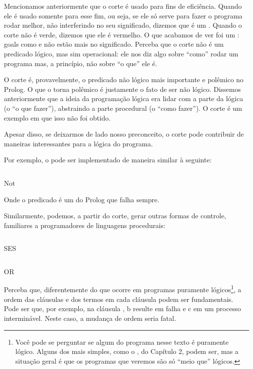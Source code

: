 \documentclass{article}
\begin{document}
Mencionamos anteriormente que o corte é usado para fins de eficiência. Quando ele é usado somente para esse fim, ou seja, se ele só serve para fazer o programa rodar melhor, não interferindo no seu significado, dizemos que é um .
Quando o corte não é verde, dizemos que ele é vermelho. O que acabamos de ver foi um : goals como  e  não estão mais no significado. Perceba que o corte não é um predicado lógico, mas sim operacional: ele nos diz algo sobre ``como'' rodar um programa mas, a princípio, não sobre ``o que'' ele é.

O corte é, provavelmente, o predicado não lógico mais importante e polêmico no Prolog. O que o torna polêmico é justamente o fato de ser não lógico. Dissemos anteriormente que a ideia da programação lógica era lidar com a parte da lógica (o ``o que fazer''), abstraindo a parte procedural (o ``como fazer''). O corte é um exemplo em que isso não foi obtido.

Apesar disso, se deixarmos de lado nosso preconceito, o corte pode contribuir de maneiras interessantes para a lógica do programa.

Por exemplo, o  pode ser implementado de maneira similar à seguinte:

    \begin{listing}
\inputminted{prolog}{../Exemplos/Cap4/prog3_not.pl}
\caption{Not}
    \end{listing}

Onde o predicado  é um  do Prolog que falha sempre.

Similarmente, podemos, a partir do corte, gerar outras formas de controle, familiares a programadores de linguagens procedurais:

    \begin{listing}
\inputminted{prolog}{../Exemplos/Cap4/prog4_ifthenelse.pl}
\caption{SES}
    \end{listing}

    \begin{listing}
\inputminted{prolog}{../Exemplos/Cap4/prog5_or.pl}
\caption{OR}
    \end{listing}

Perceba que, diferentemente do que ocorre em programas puramente lógicos\footnote{Você pode se perguntar se algum do programa nesse texto é puramente lógico. Alguns dos mais simples, como o , do Capítulo 2, %
podem ser, mas a situação geral é que os programas que veremos são só ``meio que'' lógicos.}, a ordem das cláusulas e dos termos em cada cláusula podem ser fundamentais. Pode ser que, por exemplo, na cláusula , b resulte em falha e c em um
processo interminável. Neste caso, a mudança de ordem seria fatal.
\end{document}
